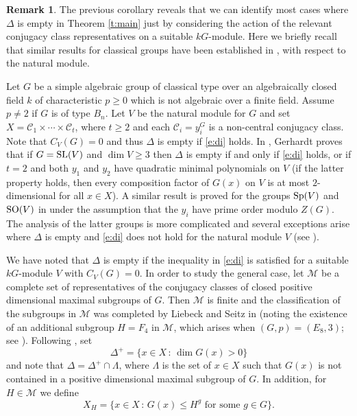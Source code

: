 \documentclass[twoside,a4paper,reqno,11pt]{amsart}
\newcommand{\<}{\langle}
\renewcommand{\>}{\rangle}
\newcommand{\leqs}{\leqslant}
\newcommand{\geqs}{\geqslant}
\renewcommand{\:}{\colon}
\theoremstyle{plain}
\theoremstyle{definition}
\newtheorem{remk}{Remark}
\begin{document}
\begin{remk}\label{r:natural}
The previous corollary reveals that we can identify most cases where $\Delta$ is empty in Theorem \ref{t:main} just by considering the action of the relevant conjugacy class representatives on a suitable $kG$-module. Here we briefly recall that similar results for classical groups have been established in \cite{BGG2,Ger}, with respect to the natural module. 

Let $G$ be a simple algebraic group of classical type over an algebraically closed field $k$ of characteristic $p \geqs 0$ which is not algebraic over a finite field. Assume $p \ne 2$ if $G$ is of type $B_n$. Let $V$ be the natural module for $G$ and set $X = \mathcal{C}_1 \times \cdots \times \mathcal{C}_t$, where $t \geqs 2$ and each $\mathcal{C}_i = y_i^G$ is a non-central conjugacy class. Note that $C_V(G) = 0$ and thus $\Delta$ is empty if \eqref{e:di} holds. In \cite{Ger}, Gerhardt proves that if $G = {\rm SL}(V)$ and $\dim V \geqs 3$ then $\Delta$ is empty if and only if \eqref{e:di} holds, or if $t=2$ and both $y_1$ and $y_2$ have quadratic minimal polynomials on $V$ (if the latter property holds, then every composition factor of $G(x)$ on $V$ is at most $2$-dimensional for all $x \in X$). A similar result is proved for the groups ${\rm Sp}(V)$ and ${\rm SO}(V)$ in \cite{BGG2} under the assumption that the $y_i$ have prime order modulo $Z(G)$. The analysis of the latter groups is more complicated and several exceptions arise where $\Delta$ is empty and \eqref{e:di} does not hold for the natural module $V$ (see \cite[Tables 1,2]{BGG2}).
\end{remk}

We have noted that $\Delta$ is empty if the inequality in \eqref{e:di} is satisfied for a suitable $kG$-module $V$ with $C_V(G)=0$. In order to study the general case, let $\mathcal{M}$ be a complete set of representatives of the conjugacy classes of closed positive dimensional maximal subgroups of $G$. Then $\mathcal{M}$ is finite and the classification of the subgroups in $\mathcal{M}$ was completed by Liebeck and Seitz in \cite{LS04} (noting the existence of an additional subgroup $H = F_4$ in $\mathcal{M}$, which arises when $(G,p) = (E_8,3)$; see \cite{CST}). Following \cite{BGG1}, set 
\[
\Delta^+ = \{x \in X \,:\, \dim G(x) > 0 \}
\]
and note that $\Delta = \Delta^+ \cap \Lambda$, where $\Lambda$ is the set of $x \in X$ such that $G(x)$ is not contained in a positive dimensional maximal subgroup of $G$. In addition, for $H \in \mathcal{M}$ we define
\begin{equation}\label{e:XHH}
X_H = \{ x \in X \,:\, \mbox{$G(x) \leqs H^g$ for some $g \in G$} \}.
\end{equation}
 
\end{document}
